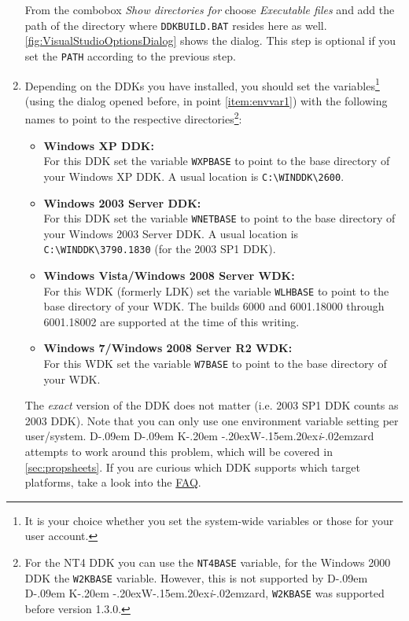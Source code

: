 \documentclass[a4paper,titlepage]{report}
\def\ddkwiz{D\kern-.09em D\kern-.09em K\kern-.20em \raise-.20ex\hbox{W}\kern-.15em\raise.20ex\hbox{\it{i}}\kern-.02em{zard}}
\begin{document}
\begin{enumerate}
    From the combobox \emph{Show directories for} choose \emph{Executable files} and add the
    path of the directory where \texttt{DDKBUILD.BAT} resides here as well.
    \autoref{fig:VisualStudioOptionsDialog} shows the dialog. This step is optional if you
    set the \texttt{PATH} according to the previous step.
  \item \label{item:envvar2}
    Depending on the DDKs you have installed, you should set the variables\footnote{It is your
    choice whether you set the system-wide variables or those for your user account.} (using
    the dialog opened before, in point \ref{item:envvar1}) with the following names to point to the
    respective directories\footnote{For the NT4 DDK you can use the \texttt{NT4BASE} variable, for
    the Windows 2000 DDK the \texttt{W2KBASE} variable.
    However, this is not supported by \ddkwiz{}, \texttt{W2KBASE} was supported before version 1.3.0.}:
    \begin{itemize}
        \item
          \textbf{Windows XP DDK:}\\
            For this DDK set the variable \texttt{WXPBASE} to point to the base directory of your
            Windows XP DDK. A usual location is \verb+C:\WINDDK\2600+.
        \item
          \textbf{Windows 2003 Server DDK:}\\
            For this DDK set the variable \texttt{WNETBASE} to point to the base directory of your
            Windows 2003 Server DDK. A usual location is \verb+C:\WINDDK\3790.1830+
            (for the 2003 SP1 DDK).
        \item
          \textbf{Windows Vista/Windows 2008 Server WDK:}\\
            For this WDK (formerly LDK) set the variable \texttt{WLHBASE} to point to the base
            directory of your WDK. The builds 6000 and 6001.18000 through 6001.18002 are supported
            at the time of this writing.
        \item
          \textbf{Windows 7/Windows 2008 Server R2 WDK:}\\
            For this WDK set the variable \texttt{W7BASE} to point to the base directory of your
            WDK.
    \end{itemize}
    The \emph{exact} version of the DDK does not matter (i.e. 2003 SP1 DDK counts as 2003 DDK).
    Note that you can only use one environment variable setting per user/system. \ddkwiz{}
    attempts to work around this problem, which will be covered in \autoref{sec:propsheets}.
    If you are curious which DDK supports which target platforms, take a look into the
    \hyperref[cha:faq]{FAQ}.
\end{enumerate}
\end{document}
